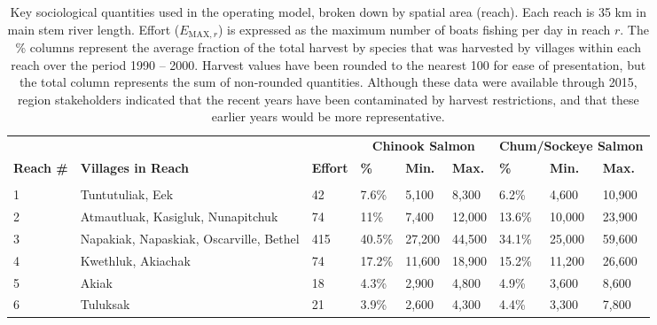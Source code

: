 \documentclass[12pt,]{book}
\theoremstyle{definition}
\theoremstyle{definition}
\theoremstyle{definition}
\theoremstyle{remark}
\begin{document}
\begin{landscape}\begin{table}

\caption{\label{tab:socio-spatial-table}Key sociological quantities used in the operating model, broken down by spatial area (reach). Each reach is 35 km in main stem river length. Effort ($E_{\text{MAX},r}$) is expressed as the maximum number of boats fishing per day in reach $r$. The \% columns represent the average fraction of the total harvest by species that was harvested by villages within each reach over the period 1990 -- 2000. Harvest values have been rounded to the nearest 100 for ease of presentation, but the total column represents the sum of non-rounded quantities. Although these data were available through 2015, region stakeholders indicated that the recent years have been contaminated by harvest restrictions, and that these earlier years would be more representative.}
\centering
\begin{tabular}[t]{lllllllll}
\toprule
\multicolumn{1}{c}{\bfseries } & \multicolumn{1}{c}{\bfseries } & \multicolumn{1}{c}{\bfseries } & \multicolumn{3}{c}{\bfseries Chinook Salmon} & \multicolumn{3}{c}{\bfseries Chum/Sockeye Salmon} \\
\cmidrule(l{2pt}r{2pt}){4-6} \cmidrule(l{2pt}r{2pt}){7-9}
\textbf{Reach \#} & \textbf{Villages in Reach} & \textbf{Effort} & \textbf{\%} & \textbf{Min.} & \textbf{Max.} & \textbf{\%} & \textbf{Min.} & \textbf{Max.}\\
\midrule
\addlinespace[0.3em]
\multicolumn{9}{l}{\textbf{Lower River}}\\
\hline
\hspace{1em}1 & Tuntutuliak, Eek & 42 & 7.6\% & 5,100 & 8,300 & 6.2\% & 4,600 & 10,900\\
\hspace{1em}2 & Atmautluak, Kasigluk, Nunapitchuk & 74 & 11\% & 7,400 & 12,000 & 13.6\% & 10,000 & 23,900\\
\hspace{1em}3 & Napakiak, Napaskiak, Oscarville, Bethel & 415 & 40.5\% & 27,200 & 44,500 & 34.1\% & 25,000 & 59,600\\
\hspace{1em}4 & Kwethluk, Akiachak & 74 & 17.2\% & 11,600 & 18,900 & 15.2\% & 11,200 & 26,600\\
\hspace{1em}5 & Akiak & 18 & 4.3\% & 2,900 & 4,800 & 4.9\% & 3,600 & 8,600\\
\hspace{1em}6 & Tuluksak & 21 & 3.9\% & 2,600 & 4,300 & 4.4\% & 3,300 & 7,800\\

\end{tabular}
\end{table}
\end{landscape}
\end{document}
